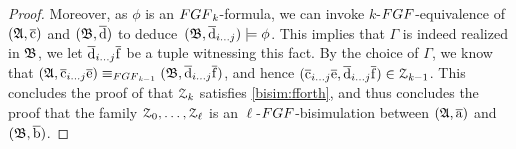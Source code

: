 \begin{proof}
Moreover, as $\phi$ is an $\FGF_{\mathit{k}}$-formula,
we can invoke $\mathit{k}$-$\FGF$-equivalence of $({\mathfrak{A}}, \overline{\mathrm{c}})$ and $({\mathfrak{B}}, \overline{\mathrm{d}})$ to deduce~$({\mathfrak{B}}, \overline{\mathrm{d}}_{i\ldots j}) \models \phi$.
This implies that $\Gamma$ is indeed realized in ${\mathfrak{B}}$, we let $\overline{\mathrm{d}}_{i\ldots j}\overline{\mathrm{f}}$ be a tuple witnessing this fact.
By the choice of $\Gamma$, we know that  $(\str{A}, \elemtuplecfromto{i}{j}\elemtuplee) \equiv_{\FGF_{\mathit{k}{-}1}} (\str{B}, \elemtupledfromto{i}{j}\elemtuplef)$, and hence
$(\overline{\mathrm{c}}_{i\ldots j}\overline{\mathrm{e}}, \overline{\mathrm{d}}_{i\ldots j}\overline{\mathrm{f}}) \in \mathcal{Z}_{\mathit{k}{-}1}$.
This concludes the proof of that $\mathcal{Z}_{\mathit{k}}$ satisfies \ref{bisim:fforth}, and thus concludes the proof that the family $\mathcal{Z}_0, \ldots, \mathcal{Z}_\ell$ is an $\ell$-$\FGF$-bisimulation between $({\mathfrak{A}}, \overline{\mathrm{a}})$ and $({\mathfrak{B}}, \overline{\mathrm{b}})$.
\end{proof}

